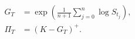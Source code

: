 \documentclass{equation-sheet}
\begin{document}
\begin{equation*}
\begin{aligned}
G_T &= \exp\!\left(\frac{1}{n+1}\sum_{j=0}^{n}\log S_{t_j}\right), \\
\Pi_T &= (K-G_T)^{+}.
\end{aligned}
\end{equation*}
\end{document}
